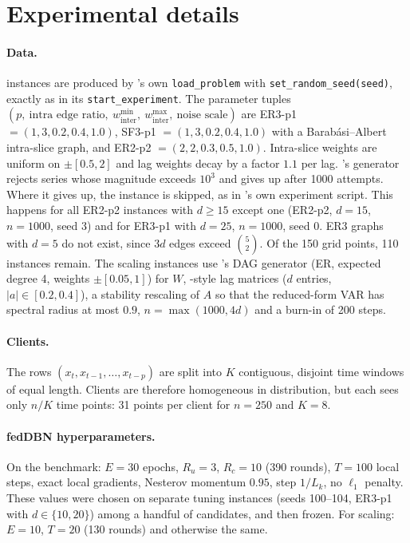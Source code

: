 \section{Experimental details}
\label{app:details}

\paragraph{Data.}
\exdbn{} instances are produced by \exdbn's own \texttt{load\_problem} with
\texttt{set\_random\_seed(seed)}, exactly as in its \texttt{start\_experiment}. The parameter
tuples $(p,\ \text{intra edge ratio},\ w^{\min}_{\mathrm{inter}},\ w^{\max}_{\mathrm{inter}},\ \text{noise scale})$
are ER3-p1 $=(1,3,0.2,0.4,1.0)$, SF3-p1 $=(1,3,0.2,0.4,1.0)$ with a Barab\'asi--Albert
intra-slice graph, and ER2-p2 $=(2,2,0.3,0.5,1.0)$. Intra-slice weights are uniform on
$\pm[0.5,2]$ and lag weights decay by a factor $1.1$ per lag. \exdbn's generator rejects
series whose magnitude exceeds $10^3$ and gives up after 1000 attempts. Where it gives up, the
instance is skipped, as in \exdbn's own experiment script. This happens for all ER2-p2
instances with $d\ge 15$ except one (ER2-p2, $d=15$, $n=1000$, seed 3) and for ER3-p1 with
$d=25$, $n=1000$, seed 0. ER3 graphs with $d=5$ do not exist, since $3d$ edges exceed
$\binom52$. Of the 150 grid points, 110 instances remain.
The scaling instances use \psidag's DAG generator (ER, expected degree 4, weights
$\pm[0.05,1]$) for $W$, \exdbn-style lag matrices ($d$ entries, $|a|\in[0.2,0.4]$), a
stability rescaling of $A$ so that the reduced-form VAR has spectral radius at most $0.9$,
$n=\max(1000,4d)$ and a burn-in of 200 steps.

\paragraph{Clients.}
The rows $(x_t, x_{t-1},\dots,x_{t-p})$ are split into $K$ contiguous, disjoint time windows of
equal length. Clients are therefore homogeneous in distribution, but each sees only $n/K$
time points: 31 points per client for $n=250$ and $K=8$.

\paragraph{fedDBN hyperparameters.}
On the \exdbn{} benchmark: $E=30$ epochs, $R_u=3$, $R_c=10$ (390 rounds), $T=100$ local
steps, exact local gradients, Nesterov momentum $0.95$, step $1/L_k$, no $\ell_1$ penalty.
These values were chosen on separate tuning instances (seeds 100--104, ER3-p1 with $d\in\{10,20\}$)
among a handful of candidates, and then frozen. For scaling: $E=10$, $T=20$ (130 rounds) and
otherwise the same.

